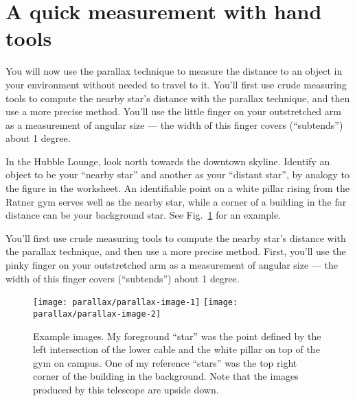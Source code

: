 

\section{A quick measurement with hand tools}

You will now use the parallax technique to measure the distance to an object in your environment without needed to travel to it. You'll first use crude measuring tools to compute the nearby star's distance with the parallax technique, and then use a more precise method. You'll use the little finger on your outstretched arm as a measurement of angular size --- the width of this finger covers (``subtends'') about 1 degree.

\begin{steps}
	\item In the Hubble Lounge, look north towards the downtown skyline. Identify an object to be your ``nearby star'' and another as your ``distant star'', by analogy to the figure in the worksheet. An identifiable point on a white pillar rising from the Ratner gym serves well as the nearby star, while a corner of a building in the far distance can be your background star. See Fig.~\ref{par:fig:images} for an example.
\end{steps}
	
You'll first use crude measuring tools to compute the nearby star's distance with the parallax technique, and then use a more precise method. First, you'll use the pinky finger on your outstretched arm as a measurement of angular size --- the width of this finger covers (``subtends'') about 1 degree.

\begin{figure}
	\texttt{[image: parallax/parallax-image-1]}
	\texttt{[image: parallax/parallax-image-2]}
	\caption{Example images. My foreground ``star'' was the point defined by the left intersection of the lower cable and the white pillar on top of the gym on campus. One of my reference ``stars'' was the top right corner of the building in the background. Note that the images produced by this telescope are upside down.}\label{par:fig:images}
\end{figure}

